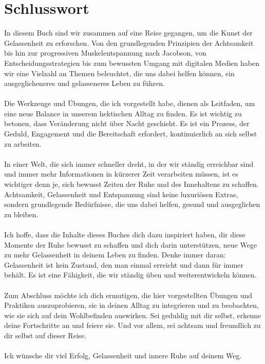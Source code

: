 \chapter*{Schlusswort}
In diesem Buch sind wir zusammen auf eine Reise gegangen, um die Kunst der Gelassenheit zu erforschen. Von den grundlegenden Prinzipien der Achtsamkeit bis hin zur progressiven Muskelentspannung nach Jacobson, von Entscheidungsstrategien bis zum bewussten Umgang mit digitalen Medien haben wir eine Vielzahl an Themen beleuchtet, die uns dabei helfen können, ein ausgeglicheneres und gelasseneres Leben zu führen.\\
\\
Die Werkzeuge und Übungen, die ich vorgestellt habe, dienen als Leitfaden, um eine neue Balance in unserem hektischen Alltag zu finden. Es ist wichtig zu betonen, dass Veränderung nicht über Nacht geschieht. Es ist ein Prozess, der Geduld, Engagement und die Bereitschaft erfordert, kontinuierlich an sich selbst zu arbeiten.\\
\\
In einer Welt, die sich immer schneller dreht, in der wir ständig erreichbar sind und immer mehr Informationen in kürzerer Zeit verarbeiten müssen, ist es wichtiger denn je, sich bewusst Zeiten der Ruhe und des Innehaltens zu schaffen. Achtsamkeit, Gelassenheit und Entspannung sind keine luxuriösen Extras, sondern grundlegende Bedürfnisse, die uns dabei helfen, gesund und ausgeglichen zu bleiben.\\
\\
Ich hoffe, dass die Inhalte dieses Buches dich dazu inspiriert haben, dir diese Momente der Ruhe bewusst zu schaffen und dich darin unterstützen, neue Wege zu mehr Gelassenheit in deinem Leben zu finden. Denke immer daran: Gelassenheit ist kein Zustand, den man einmal erreicht und dann für immer behält. Es ist eine Fähigkeit, die wir ständig üben und weiterentwickeln können.\\
\\
Zum Abschluss möchte ich dich ermutigen, die hier vorgestellten Übungen und Praktiken auszuprobieren, sie in deinen Alltag zu integrieren und zu beobachten, wie sie sich auf dein Wohlbefinden auswirken. Sei geduldig mit dir selbst, erkenne deine Fortschritte an und feiere sie. Und vor allem, sei achtsam und freundlich zu dir selbst auf dieser Reise.\\
\\
Ich wünsche dir viel Erfolg, Gelassenheit und innere Ruhe auf deinem Weg.
